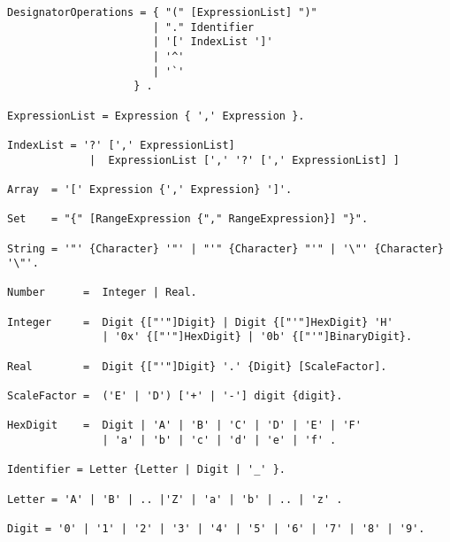 \documentclass[a4wide,11pt]{article}
\begin{document}
\begin{lstlisting}[style=EBNF]
DesignatorOperations = { "(" [ExpressionList] ")"
                       | "." Identifier
                       | '[' IndexList ']'
                       | '^'
                       | '`'
                    } .

ExpressionList = Expression { ',' Expression }.

IndexList = '?' [',' ExpressionList]
             |  ExpressionList [',' '?' [',' ExpressionList] ]

Array  = '[' Expression {',' Expression} ']'.

Set    = "{" [RangeExpression {"," RangeExpression}] "}".

String = '"' {Character} '"' | "'" {Character} "'" | '\"' {Character} '\"'.

Number      =  Integer | Real.

Integer     =  Digit {["'"]Digit} | Digit {["'"]HexDigit} 'H'
               | '0x' {["'"]HexDigit} | '0b' {["'"]BinaryDigit}.

Real        =  Digit {["'"]Digit} '.' {Digit} [ScaleFactor].

ScaleFactor =  ('E' | 'D') ['+' | '-'] digit {digit}.

HexDigit    =  Digit | 'A' | 'B' | 'C' | 'D' | 'E' | 'F'
               | 'a' | 'b' | 'c' | 'd' | 'e' | 'f' .

Identifier = Letter {Letter | Digit | '_' }.

Letter = 'A' | 'B' | .. |'Z' | 'a' | 'b' | .. | 'z' .

Digit = '0' | '1' | '2' | '3' | '4' | '5' | '6' | '7' | '8' | '9'.
\end{lstlisting}
\end{document}
